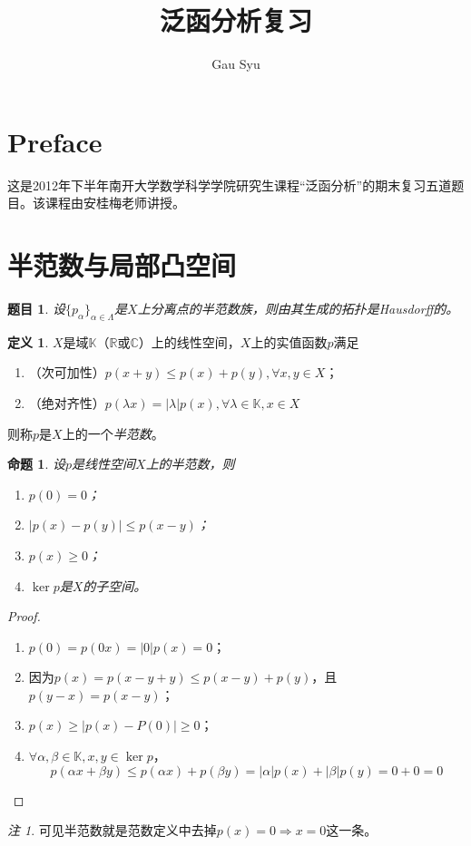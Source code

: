\documentclass[winfonts,UTF8,c5size,a4paper,fancyhdr,hyperref,titlepage,nocap]{ctexart}
\title{泛函分析复习}
\author{Gau Syu}
\theoremstyle{question}
\newtheorem{Qut}{题目}
\theoremstyle{theorem}
\newtheorem{prop}[thm]{命题}
\theoremstyle{definition}
\newtheorem{defn}[thm]{定义}
\theoremstyle{remark}
\newtheorem*{rem}{注}
\numberwithin{equation}{subsection}
\newcommand{\Real}{\mathbb{R}}
\newcommand{\Complex}{\mathbb{C}}
\newcommand{\K}{\mathbb{K}}
\newcommand{\red}{\color{red}}
\begin{document}
\maketitle
\pagestyle{plain}
\section*{Preface}
这是2012年下半年南开大学数学科学学院研究生课程“泛函分析”的期末复习五道题目。该课程由安桂梅老师讲授。
\tableofcontents
\newpage
\section{半范数与局部凸空间}
\begin{Qut}
设$\{p_{\alpha}\}_{\alpha\in\Lambda}$是$X$上分离点的半范数族，则由其生成的拓扑是Hausdorff的。
\end{Qut}
\begin{defn}
  $X$是域$\K$（$\Real$或$\Complex$）上的线性空间，$X$上的实值函数$p$满足
\begin{enumerate}[1)]
    \setlength{\itemindent}{2ex}
    \item （次可加性）$p(x + y) \leqslant p(x) + p(y), \forall x, y\in X$；
    \item （绝对齐性）$p(\lambda x)=|\lambda|p(x), \forall\lambda\in\K, x\in X$
\end{enumerate}
则称$p$是$X$上的一个\emph{\red 半范数}。
\end{defn}

\begin{prop}
  设$p$是线性空间$X$上的半范数，则
\begin{enumerate}[1)]
    \setlength{\itemindent}{2ex}
    \item $p(0)=0$；
    \item $|p(x)-p(y)|\leqslant p(x-y)$；
    \item $p(x)\geqslant 0$；
    \item $\ker p$是$X$的子空间。
\end{enumerate}
\end{prop}
\begin{proof}
\begin{enumerate}[1)]
    \setlength{\itemindent}{2ex}
    \item $p(0)=p(0x)=|0|p(x)=0$；
    \item 因为$p(x)=p(x-y+y)\leqslant p(x-y)+p(y)$，且$p(y-x)=p(x-y)$；
    \item $p(x)\geqslant|p(x)-P(0)|\geqslant0$；
    \item $\forall \alpha,\beta\in\K, x,y\in\ker p$，
             \begin{equation*}
             p(\alpha x+\beta y)\leqslant p(\alpha x)+p(\beta y)=|\alpha|p(x)+|\beta|p(y)=0+0=0
             \end{equation*}
\end{enumerate}
\end{proof}
\begin{rem}
可见半范数就是范数定义中去掉$p(x)=0\Rightarrow x=0$这一条。
\end{rem}
\end{document}
